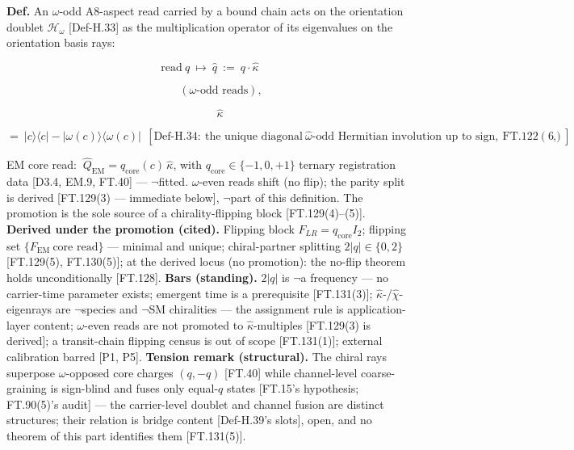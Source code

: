 \begin{definition}\label{tag:Def-H-43}
\textbf{Def.} An $\omega$-odd A8-aspect read carried by a bound chain acts on the orientation doublet $\mathcal H_\omega$ [Def-H.33] as the multiplication operator of its eigenvalues on the orientation basis rays:

\[
\text{read}\ q\ \longmapsto\ \hat q\ :=\ q\cdot\hat\kappa
\]

\[
\qquad (\omega\text{-odd reads}),
\]

\[
\qquad \hat\kappa\
\]

\[
= \ |c\rangle\langle c|-|\omega(c)\rangle\langle\omega(c)|\ \ [\mathrm{Def\text{-}H.34}:\ \text{the unique diagonal}\ \hat\omega\text{-odd Hermitian involution up to sign},\ \mathrm{FT.122}(6)],
\]

EM core read: $\ \hat Q_{\mathrm{EM}}=q_{\mathrm{core}}(c)\,\hat\kappa$, with $q_{\mathrm{core}}\in\{-1,0,+1\}$ ternary registration data [D3.4, EM.9, FT.40] — $\neg$fitted. $\omega$-even reads shift (no flip); the parity split is derived [FT.129(3) — immediate below], $\neg$part of this definition. The promotion is the sole source of a chirality-flipping block [FT.129(4)–(5)]. \textbf{Derived under the promotion (cited).} Flipping block $F_{LR}=q_{\mathrm{core}}I_2$; flipping set $\{F_{\mathrm{EM}}\ \text{core read}\}$ — minimal and unique; chiral-partner splitting $2|q|\in\{0,2\}$ [FT.129(5), FT.130(5)]; at the derived locus (no promotion): the no-flip theorem holds unconditionally [FT.128]. \textbf{Bars (standing).} $2|q|$ is $\neg$a frequency — no carrier-time parameter exists; emergent time is a prerequisite [FT.131(3)]; $\hat\kappa$-/$\hat\chi$-eigenrays are $\neg$species and $\neg$SM chiralities — the assignment rule is application-layer content; $\omega$-even reads are not promoted to $\hat\kappa$-multiples [FT.129(3) is derived]; a transit-chain flipping census is out of scope [FT.131(1)]; external calibration barred [P1, P5]. \textbf{Tension remark (structural).} The chiral rays superpose $\omega$-opposed core charges $(q,-q)$ [FT.40] while channel-level coarse-graining is sign-blind and fuses only equal-$q$ states [FT.15's hypothesis; FT.90(5)'s audit] — the carrier-level doublet and channel fusion are distinct structures; their relation is bridge content [Def-H.39's slots], open, and no theorem of this part identifies them [FT.131(5)].

\end{definition}

